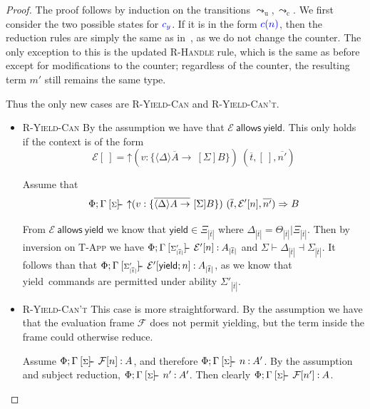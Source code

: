 \documentclass[msc,deptreport,cs]{infthesis} %
\newcommand{\counter}{{\color{blue}c_y}}
\newcommand{\justc}[1]{{\color{blue} c({#1})}}
\newcommand\yield{\textsf{yield}\xspace}
\newcommand\allows{\textsf{allows}\xspace}
\newcommand\Cse{\textbf{Case}}
\newcommand{\many}{\overline}
\newcommand{\sigentails}[1]{\mathbin{[{\text{\scriptsize ${#1}$}}]\hspace{-0.4ex}\text{-\!-}}\,}
\newcommand{\inferbase}[5]{#1; #3 \mathbin{#2} {#4} \Rightarrow {#5}}
\newcommand{\checkbase}[5]{#1; #3 \mathbin{#2} #5 \mathbin{:} #4}
\newcommand{\makes}[5]{\inferbase{#1}{\sigentails{#3}}{#2}{#4}{#5}}
\newcommand{\has}[5]{\checkbase{#1}{\sigentails{#3}}{#2}{#4}{#5}}
\newcommand{\checksk}{\has{\kenv}}
\newcommand{\inferskgs}{\makes{\kenv}{\Gamma}{\sigs}}
\newcommand{\checkskgs}{\has{\kenv}{\Gamma}{\sigs}}
\newcommand{\adj}{\Delta}
\newcommand{\adapt}{\Theta}
\newcommand{\ext}{\Xi}
\newcommand{\sigs}{\Sigma}
\newcommand{\thunk}[1]{\{{#1}\}}
\newcommand{\effin}[1]{\langle {#1} \rangle}
\newcommand{\effout}[1]{[{#1}]}
\newcommand{\EC}{\mathcal{E}}
\newcommand{\EF}{\mathcal{F}}
\newcommand{\cu}{\mathord{\uparrow}}
\newcommand{\redtou}{\leadsto_{\mathrm{u}}}
\newcommand{\redtoc}{\leadsto_{\mathrm{c}}}
\newcommand{\kenv}{\Phi}  %
\newcommand{\adjact}[3]{{#1}\vdash{#2}\dashv{#3}}
\newcommand{\pipe}{\texttt{|}}
\begin{document}
\begin{proof}
The proof follows by induction on the transitions $\redtou, \redtoc$. We first
consider the two possible states for $\counter$. If it is in the form
$\justc{n}$, then the reduction rules are simply the same as
in~\cite{convent2020doo}, as we do not change the counter. The only exception to
this is the updated \textsc{R-Handle} rule, which is the same as before except
for modifications to the counter; regardless of the counter, the resulting term
$m'$ still remains the same type.

Thus the only new cases are \textsc{R-Yield-Can} and \textsc{R-Yield-Can't}.

\begin{itemize}
\item[\Cse] \textsc{R-Yield-Can}
  By the assumption we have that $\EC~\allows~\yield$. This only holds
  if the context is of the form
  \[\EC[~] = \cu (v : \thunk{\many{\effin{\adj} A
      \to}~\effout{\sigs}B})~(\many{t},[~],\many{n'})\]

  Assume that
  \[\inferskgs{\cu (v : \thunk{\many{\effin{\adj} A
      \to}~\effout{\sigs}B})~(\many{t},\EC'[n],\many{n'})}{B}\]

  From $\EC~\allows~\yield$ we know that $\yield \in \ext_{|\many{t}|}$ where
  $\adj_{|\many{t}|} = \adapt_{|\many{t}|}\pipe\ext_{|\many{t}|}$.
  Then by inversion on \textsc{T-App} we have
  $\checksk{\Gamma}{\sigs'_{|\many{t}|}}{A_{|\many{t}|}}{\EC'[n]}$ and
  $\adjact{\sigs}{\adj_{|\many{t}|}}{\sigs_{|\many{t}|}}$.
  It follows than that
  $\checksk{\Gamma}{\sigs'_{|\many{t}|}}{A_{|\many{t}|}}{\EC'[\yield; n]}$, as
  we know that \yield~commands are permitted under ability $\sigs'_{|\many{t}|}$.


\item[\Cse] \textsc{R-Yield-Can't}
  This case is more straightforward. By the assumption we have that the
  evaluation frame $\EF$ does not permit yielding, but the term inside the frame
  could otherwise reduce.

  Assume $\checkskgs{A}{\EF[n]}$, and therefore $\checkskgs{A'}{n}$. By the
  assumption and subject reduction, $\checkskgs{A'}{n'}$. Then clearly
  $\checkskgs{A}{\EF[n']}$.

\end{itemize}
\end{proof}
\end{document}
